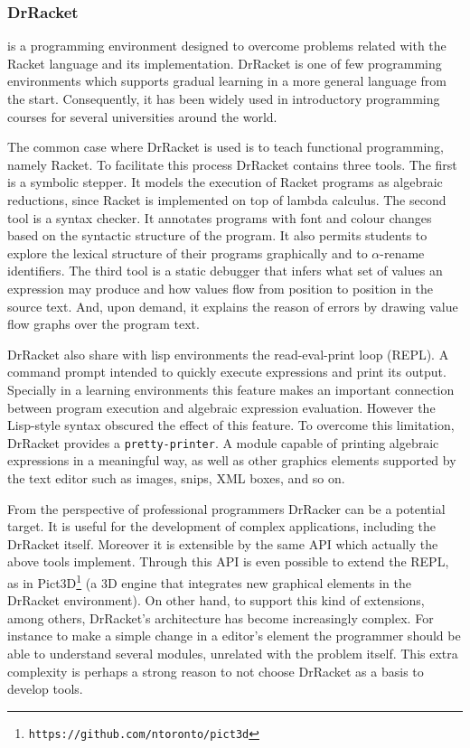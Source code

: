 \subsubsection{DrRacket~\cite{findler2002drscheme}} is a programming environment designed to overcome problems related with the Racket language and its implementation. DrRacket is one of few programming environments which supports gradual learning in a more general language from the start. Consequently, it has been widely used in introductory programming courses for several universities around the world.

The common case where DrRacket is used is to teach functional programming, namely Racket. To facilitate this process DrRacket contains three tools. The first is a symbolic stepper. It models the execution of Racket programs as algebraic reductions, since Racket is implemented on top of lambda calculus. The second tool is a syntax checker. It annotates programs with font and colour changes based on the syntactic structure of the program. It also permits students to explore the lexical structure of their programs graphically and to $\alpha$-rename identifiers. The third tool is a static debugger that infers what set of values an expression may produce and how values flow from position to position in the source text. And, upon demand, it explains the reason of errors by drawing value flow graphs over the program text.

DrRacket also share with lisp environments the read-eval-print loop (REPL). A command prompt intended to quickly execute expressions and print its output. Specially in a learning environments this feature makes an important connection between program execution and algebraic expression evaluation. However the Lisp-style syntax obscured the effect of this feature. To overcome this limitation, DrRacket provides a \texttt{pretty-printer}. A module capable of printing algebraic expressions in a meaningful way, as well as other graphics elements supported by the text editor such as images, snips, XML boxes, and so on.

From the perspective of professional programmers DrRacker can be a potential target. It is useful for the development of complex applications, including the DrRacket itself. Moreover it is extensible by the same API which actually the above tools implement. Through this API is even possible to extend the REPL, as in Pict3D\footnote{\texttt{https://github.com/ntoronto/pict3d}} (a 3D engine that integrates new graphical elements in the DrRacket environment). On other hand, to support this kind of extensions, among others, DrRacket's architecture has become increasingly complex. For instance to make a simple change in a editor's element the programmer should be able to understand several modules, unrelated with the problem itself. This extra complexity is perhaps a strong reason to not choose DrRacket as a basis to develop tools.

